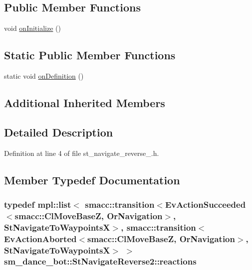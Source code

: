 \subsection*{Public Member Functions}
\begin{DoxyCompactItemize}
\item 
void \hyperlink{structsm__dance__bot_1_1StNavigateReverse2_a4d74042993d79e65a7f5d4e077359be2}{on\+Initialize} ()
\end{DoxyCompactItemize}
\subsection*{Static Public Member Functions}
\begin{DoxyCompactItemize}
\item 
static void \hyperlink{structsm__dance__bot_1_1StNavigateReverse2_a079233c4212ed1565780a4a0c542a00e}{on\+Definition} ()
\end{DoxyCompactItemize}
\subsection*{Additional Inherited Members}


\subsection{Detailed Description}


Definition at line 4 of file st\+\_\+navigate\+\_\+reverse\+\_.\+h.



\subsection{Member Typedef Documentation}
\subsubsection[{\texorpdfstring{reactions}{reactions}}]{\setlength{\rightskip}{0pt plus 5cm}typedef mpl\+::list$<$ {\bf smacc\+::transition}$<$Ev\+Action\+Succeeded$<${\bf smacc\+::\+Cl\+Move\+BaseZ}, {\bf Or\+Navigation}$>$, {\bf St\+Navigate\+To\+WaypointsX}$>$, {\bf smacc\+::transition}$<$Ev\+Action\+Aborted$<${\bf smacc\+::\+Cl\+Move\+BaseZ}, {\bf Or\+Navigation}$>$, {\bf St\+Navigate\+To\+WaypointsX}$>$ $>$ {\bf sm\+\_\+dance\+\_\+bot\+::\+St\+Navigate\+Reverse2\+::reactions}}\hypertarget{structsm__dance__bot_1_1StNavigateReverse2_a072c8736a8ca0c6a9771a6e6cf817ba0}{}\label{structsm__dance__bot_1_1StNavigateReverse2_a072c8736a8ca0c6a9771a6e6cf817ba0}


